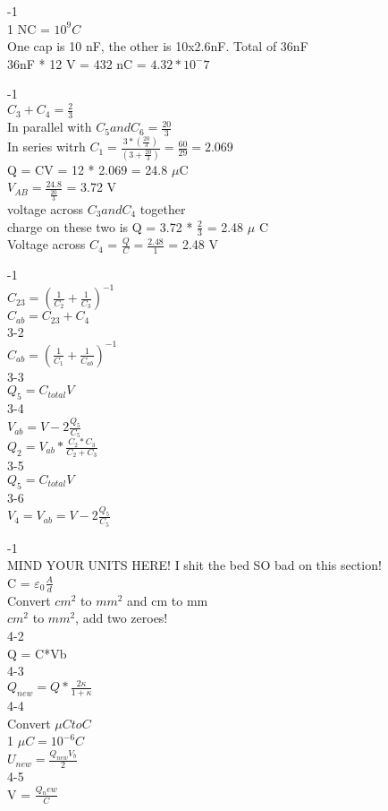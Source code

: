 \documentclass{article}
\begin{document}
-1 \\
1 NC = $10^9C$ \\
One cap is 10 nF, the other is 10x2.6nF. Total of 36nF \\
36nF * 12 V = 432 nC = $4.32*10^-7$

\vspace{2mm}

-1 \\
$C_3 + C_4 = \frac{2}{3}$ \\
In parallel with $C_5 and C_6 = \frac{20}{3}$ \\
In series witrh $C_1 = \frac{3 * (\frac{20}{3})}{(3 + \frac{20}{3})} = \frac{60}{29} = 2.069 $ \\
Q = CV = 12 * 2.069 = 24.8 $\mu$C \\
$V_{AB} = \frac{24.8}{\frac{20}{3}}$ = 3.72 V \\
voltage across $C_3 and C_4$ together \\
charge on these two is Q = 3.72 * $\frac{2}{3}$ = 2.48 $\mu$ C \\
Voltage across $C_4$ = $\frac{Q}{C} = \frac{2.48}{1}$ = 2.48 V

\vspace{2mm}

-1 \\
$C_{23} = (\frac{1}{C_2} + \frac{1}{C_3})^{-1}$ \\
$C_{ab} = C_{23} + C_4$ \\
3-2 \\
$C_{ab} = (\frac{1}{C_1} + \frac{1}{C_{ab}})^{-1}$ \\
3-3 \\
$Q_5 = C_{total}V$ \\
3-4 \\
$V_{ab} = V - 2\frac{Q_5}{C_5}$ \\
$Q_2 = V_{ab} * \frac{C_2 * C_3}{C_2 + C_3}$ \\
3-5 \\
$Q_5 = C_{total}V$ \\
3-6 \\
$V_4 = V_{ab} = V - 2\frac{Q_5}{C_5}$

\vspace{2mm}

-1 \\
MIND YOUR UNITS HERE! I shit the bed SO bad on this section! \\
C = $\varepsilon_0 \frac{A}{d}$ \\
Convert $cm^2$ to $mm^2$ and cm to mm \\
$cm^2$ to $mm^2$, add two zeroes! \\
4-2 \\
Q = C*Vb \\
4-3 \\
$Q_{new} = Q * \frac{2\kappa}{1+ \kappa}$ \\
4-4 \\
Convert $\mu C to C$ \\
1 $\mu C = 10^{-6} C $ \\
$U_{new} = \frac{Q_{new} V_b}{2}$ \\
4-5 \\
V = $\frac{Q_new}{C}$
\end{document}

